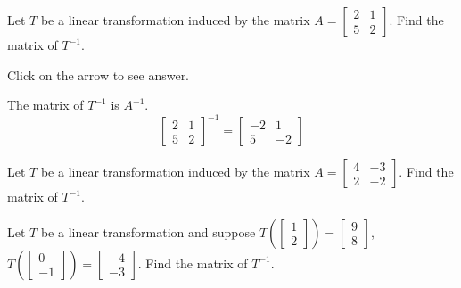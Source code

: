 \documentclass{ximera}
\begin{document}
\begin{problem}\label{prb:6.8} Let $T$ be a linear transformation induced by the matrix $A = \left[ \begin{array}{rr}
2 & 1 \\
5 & 2
\end{array} \right]$. Find the matrix of $T^{-1}$.

Click on the arrow to see answer.
\begin{expandable}
The matrix of $T^{-1}$ is $A^{-1}$.
\[
\left[ \begin{array}{rr}
2 & 1 \\
5 & 2
\end{array} \right] ^{-1} =
\left[
\begin{array}{rr}
-2 & 1 \\
5 & -2
\end{array}
\right]
\]
\end{expandable}
\end{problem}

\begin{problem}\label{prb:6.9} Let $T$ be a linear transformation induced by the matrix $A = \left[ \begin{array}{rr}
4 & -3 \\
2 & -2
\end{array} \right]$. Find the matrix of $T^{-1}$.
\end{problem}

\begin{problem}\label{prb:6.10} Let $T$ be a linear transformation and suppose $T \left( \left[ \begin{array}{r}
1 \\
2
\end{array}\right] \right) = \left[ \begin{array}{r}
9 \\
8
\end{array} \right]$, $T \left( \left[ \begin{array}{r}
0 \\
-1
\end{array}\right] \right) = \left[ \begin{array}{r}
-4 \\
-3
\end{array}\right]$.
Find the matrix of $T^{-1}$.
\end{problem}
\end{document}

